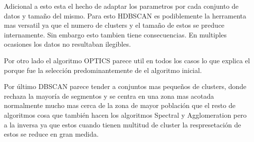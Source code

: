 Adicional a esto esta el hecho de adaptar los parametros por cada conjunto de datos y tamaño del mismo. Para esto HDBSCAN es podiblemente la herramenta mas versatil ya que el numero de clusters y el tamaño de estos se preduce internamente. Sin embargo esto tambien tiene consecuencias. En multiples ocasiones los datos no resultaban ilegibles.

Por otro lado el algoritmo OPTICS parece util en todos los casos lo que explica el porque fue la selección predominantemente de el algoritmo inicial.

Por último DBSCAN parece tender a conjuntos mas pequeños de clusters, donde rechaza la mayoría de segmentos y se centra en una zona mas acotada normalmente mucho mas cerca de la zona de mayor población que el resto de algoritmos cosa que también hacen los algoritmos Spectral y Agglomeration pero a la inversa ya que estos cuando tienen multitud de cluster la respresetación de estos se reduce en gran medida.









